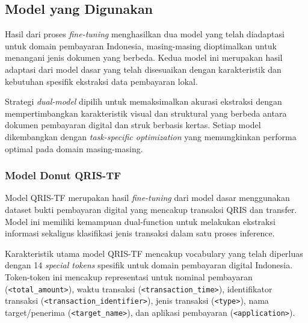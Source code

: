 \subsection{Model yang Digunakan}
\label{subsec:model-yang-digunakan}

Hasil dari proses \emph{fine-tuning} menghasilkan dua model yang telah diadaptasi untuk domain pembayaran Indonesia, masing-masing dioptimalkan untuk menangani jenis dokumen yang berbeda. Kedua model ini merupakan hasil adaptasi dari model \donut{} dasar yang telah disesuaikan dengan karakteristik dan kebutuhan spesifik ekstraksi data pembayaran lokal.


Strategi \emph{dual-model} dipilih untuk memaksimalkan akurasi ekstraksi dengan mempertimbangkan karakteristik visual dan struktural yang berbeda antara dokumen pembayaran digital dan struk berbasis kertas. Setiap model dikembangkan dengan \emph{task-specific optimization} yang memungkinkan performa optimal pada domain masing-masing.

\subsubsection{Model Donut QRIS-TF}
\label{subsubsec:model-qris-tf}

Model QRIS-TF merupakan hasil \emph{fine-tuning} dari model \donut{} dasar menggunakan dataset bukti pembayaran digital yang mencakup transaksi QRIS dan transfer. Model ini memiliki kemampuan dual-function untuk melakukan ekstraksi informasi sekaligus klasifikasi jenis transaksi dalam satu proses inference.


Karakteristik utama model QRIS-TF mencakup vocabulary yang telah diperluas dengan 14 \emph{special tokens} spesifik untuk domain pembayaran digital Indonesia. Token-token ini mencakup representasi untuk nominal pembayaran (\texttt{<total\_amount>}), waktu transaksi (\texttt{<transaction\_time>}), identifikator transaksi (\texttt{<transaction\_identifier>}), jenis transaksi (\texttt{<type>}), nama target/penerima (\texttt{<target\_name>}), dan aplikasi pembayaran (\texttt{<application>}).

